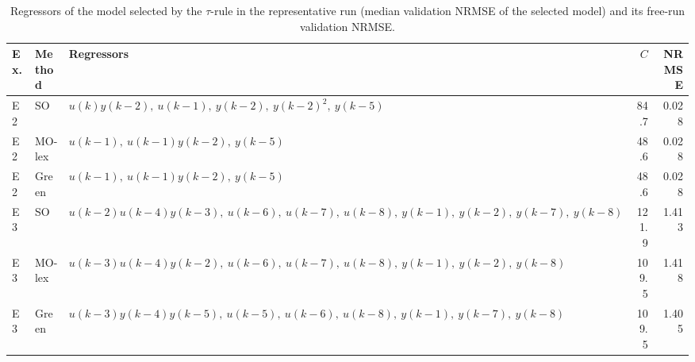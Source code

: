 \begin{table}[t]
\centering
\caption{Regressors of the model selected by the $\tau$-rule in the representative run (median validation NRMSE of the selected model) and its free-run validation NRMSE.}
\label{tab:models_K}
\setlength{\tabcolsep}{3pt}
\footnotesize
\begin{tabular}{llp{8.5cm}rr}
\toprule
Ex. & Method & Regressors & $C$ & NRMSE \\
\midrule
E2 & SO & $u(k) y(k-2),\ u(k-1),\ y(k-2),\ y(k-2)^{2},\ y(k-5)$ & 84.7 & 0.028 \\
E2 & MO-lex & $u(k-1),\ u(k-1) y(k-2),\ y(k-5)$ & 48.6 & 0.028 \\
E2 & Green & $u(k-1),\ u(k-1) y(k-2),\ y(k-5)$ & 48.6 & 0.028 \\
\midrule
E3 & SO & $u(k-2) u(k-4) y(k-3),\ u(k-6),\ u(k-7),\ u(k-8),\ y(k-1),\ y(k-2),\ y(k-7),\ y(k-8)$ & 121.9 & 1.413 \\
E3 & MO-lex & $u(k-3) u(k-4) y(k-2),\ u(k-6),\ u(k-7),\ u(k-8),\ y(k-1),\ y(k-2),\ y(k-8)$ & 109.5 & 1.418 \\
E3 & Green & $u(k-3) y(k-4) y(k-5),\ u(k-5),\ u(k-6),\ u(k-8),\ y(k-1),\ y(k-7),\ y(k-8)$ & 109.5 & 1.405 \\
\bottomrule
\end{tabular}
\end{table}
